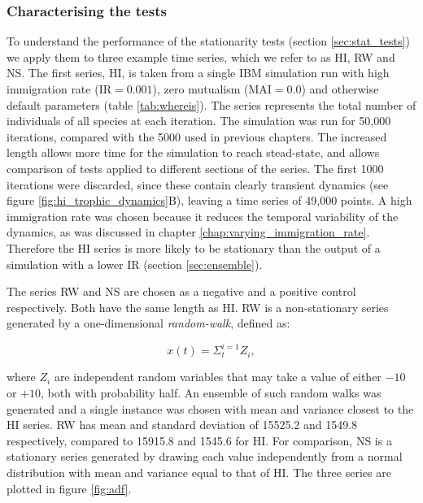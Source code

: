 \subsubsection{Characterising the tests}
\label{sec:characterising_stat_tests}


To understand the performance of the stationarity tests (section \ref{sec:stat_tests}) we apply them to three example time series, which we refer to as HI, RW and NS. The first series, HI, is taken from a single IBM simulation run with high immigration rate (IR$=0.001$), zero mutualism (MAI$=0.0$) and otherwise default parameters (table \ref{tab:whereis}).  The series represents the total number of individuals of all species at each iteration. The simulation was run for 50,000 iterations, compared with the 5000 used in previous chapters. The increased length allows more time for the simulation to reach stead-state, and allows comparison of tests applied to different sections of the series. The first 1000 iterations were discarded, since these contain clearly transient dynamics (see figure \ref{fig:hi_trophic_dynamics}B), leaving a time series of 49,000 points. A high immigration rate was chosen because it reduces the temporal variability of the dynamics, as was discussed in chapter \ref{chap:varying_immigration_rate}. Therefore the HI series is more likely to be stationary than the output of a simulation with a lower IR (section \ref{sec:ensemble}).

The series RW and NS are chosen as a negative and a positive control respectively. Both have the same length as HI. RW is a non-stationary series generated by a one-dimensional \emph{random-walk}, defined as:

\begin{equation}
	x(t) = \Sigma_{t}^{i=1} Z_i, 
\end{equation}   

where $Z_i$ are independent random variables that may take a value of either $-10$ or $+10$, both with probability half. An ensemble of such random walks was generated and a single instance was chosen with mean and variance closest to the HI series. RW has mean and standard deviation of 15525.2 and 1549.8 respectively, compared to 15915.8 and 1545.6 for HI. For comparison, NS is a stationary series generated by drawing each value independently from a normal distribution with mean and variance  equal to that of HI. The three series are plotted in figure \ref{fig:adf}.
  
